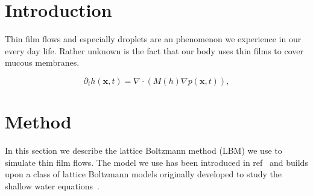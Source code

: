 \documentclass[twocolumn,amsmath,amssymb,showpacs,pre,nofootinbib,superscriptaddress]{revtex4-1} %
\begin{document}
\maketitle

\newcommand{\ts}{\textsuperscript}

\section{Introduction}\label{sec:intro}
Thin film flows and especially droplets are an phenomenon we experience in our every day life.
Rather unknown is the fact that our body uses thin films to cover mucous membranes.

\begin{equation}\label{eq:thin_film}
    \partial_t h(\mathbf{x},t) = \nabla\cdot\left(M(h)\nabla p(\mathbf{x},t)\right),
\end{equation}

\section{Method}\label{sec:method}
In this section we describe the lattice Boltzmann method (LBM) we use to simulate thin film flows.
The model we use has been introduced in ref~\cite{PhysRevE.100.033313} and builds upon a class of lattice Boltzmann models originally developed to study the shallow water equations~\cite{Salmon:1999:0022-2402:503, zhou2004lattice, PhysRevE.65.036309}.
\end{document}
